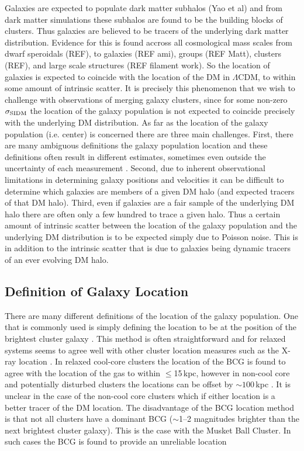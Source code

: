 Galaxies are expected to populate dark matter subhalos (Yao et al) and from dark matter simulations these subhalos are found to be the building blocks of clusters.
Thus galaxies are believed to be tracers of the underlying dark matter distribution.
Evidence for this is found accross all cosmological mass scales from dwarf speroidals (REF), to galaxies (REF ami), groups (REF Matt), clusters (REF), and large scale structures (REF filament work).
So the location of galaxies is expected to coincide with the location of the DM in $\Lambda$CDM, to within some amount of intrinsic scatter.
It is precisely this phenomenon that we wish to challenge with observations of merging galaxy clusters, since for some non-zero $\sigma_{\rm SIDM}$ the location of the galaxy population is not expected to coincide precisely with the underlying DM distribution.
As far as the location of the galaxy population (i.e. center) is concerned there are three main challenges.
First, there are many ambiguous definitions the galaxy population location and these definitions often result in different estimates, sometimes even outside the uncertainty of each measurement \citep{George:2012uo}.
Second, due to inherent observational limitations in determining galaxy positions and velocities it can be difficult to determine which galaxies are members of a given DM halo (and expected tracers of that DM halo).
Third, even if galaxies are a fair sample of the underlying DM halo there are often only a few hundred to trace a given halo.
Thus a certain amount of intrinsic scatter between the location of the galaxy population and the underlying DM distribution is to be expected simply due to Poisson noise.
This is in addition to the intrinsic scatter that is due to galaxies being dynamic tracers of an ever evolving DM halo. 

\subsection{Definition of Galaxy Location}

There are many different definitions of the location of the galaxy population.  
One that is commonly used is simply defining the location to be at the position of the brightest cluster galaxy \citep[e.g.][]{Gladders:2000ca, Koester:2007en, Hao:2010kz}.
This method is often straightforward and for relaxed systems seems to agree well with other cluster location measures such as the X-ray location \citep{Sheldon:2001kk, Koester:2007en, Sanderson:2009hi,George:2012uo}.
In relaxed cool-core clusters the location of the BCG is found to agree with the location of the gas to within $\leq$15\,kpc, however in non-cool core and potentially disturbed clusters the locations can be offset by $\sim100$\,kpc \citep{Sanderson:2009hi}.
It is unclear in the case of the \citet{Sanderson:2009hi} non-cool core clusters which if either location is a better tracer of the DM location.
The disadvantage of the BCG location method is that not all clusters have a dominant BCG ($\sim$1--2 magnitudes brighter than the next brightest cluster galaxy).
This is the case with the Musket Ball Cluster.
In such cases the BCG is found to provide an unreliable location \citep[see e.g.][]{George:2012uo}

